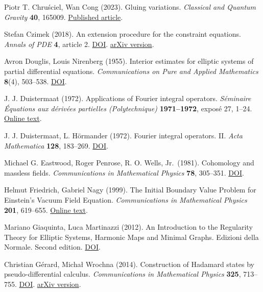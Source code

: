 \documentclass[
  english,
  11pt,
  reqno]{amsart}
\begin{document}
\leavevmode{}\label{ref-ChruscielCong2023}Piotr T. Chruściel, Wan Cong (2023). Gluing variations. \emph{Classical
and Quantum Gravity} \textbf{40}, 165009.
\href{https://doi.org/10.1088/1361-6382/ace494}{Published article}.

\leavevmode{}\label{ref-Czimek2018}Stefan Czimek (2018). An extension procedure for the constraint
equations. \emph{Annals of PDE} \textbf{4}, article 2.
\href{https://doi.org/10.1007/s40818-017-0039-3}{DOI}.
\href{https://arxiv.org/abs/1609.08814v2}{arXiv version}.

\leavevmode{}\label{ref-DouglisNirenberg1955}Avron Douglis, Louis Nirenberg (1955). Interior estimates for elliptic
systems of partial differential equations. \emph{Communications on Pure
and Applied Mathematics} \textbf{8}(4), 503--538.
\href{https://doi.org/10.1002/cpa.3160080406}{DOI}.

\leavevmode{}\label{ref-Duistermaat1972FIO}J. J. Duistermaat (1972). Applications of Fourier integral operators.
\emph{Séminaire Équations aux dérivées partielles (Polytechnique)}
\textbf{1971--1972}, exposé 27, 1--24.
\href{https://www.numdam.org/article/SEDP_1971-1972____A27_0.pdf}{Online
text}.

\leavevmode{}\label{ref-DuistermaatHormander1972}J. J. Duistermaat, L. Hörmander (1972). Fourier integral operators. II.
\emph{Acta Mathematica} \textbf{128}, 183--269.
\href{https://doi.org/10.1007/BF02392165}{DOI}.

\leavevmode{}\label{ref-EastwoodPenroseWells1981}Michael G. Eastwood, Roger Penrose, R. O. Wells, Jr.~(1981). Cohomology
and massless fields. \emph{Communications in Mathematical Physics}
\textbf{78}, 305--351. \href{https://doi.org/10.1007/BF01942327}{DOI}.

\leavevmode{}\label{ref-FriedrichNagy1999}Helmut Friedrich, Gabriel Nagy (1999). The Initial Boundary Value
Problem for Einstein's Vacuum Field Equation. \emph{Communications in
Mathematical Physics} \textbf{201}, 619--655.
\href{https://users.math.msu.edu/users/gnagy/papers/hFgN99.pdf}{Online
text}.

\leavevmode{}\label{ref-GiaquintaMartinazzi2012}Mariano Giaquinta, Luca Martinazzi (2012). An Introduction to the
Regularity Theory for Elliptic Systems, Harmonic Maps and Minimal
Graphs. Edizioni della Normale. Second edition.
\href{https://doi.org/10.1007/978-88-7642-443-4}{DOI}.

\leavevmode{}\label{ref-gerard-wrochna2014}Christian Gérard, Michał Wrochna (2014). Construction of Hadamard states
by pseudo-differential calculus. \emph{Communications in Mathematical
Physics} \textbf{325}, 713--755.
\href{https://doi.org/10.1007/s00220-013-1824-9}{DOI}.
\href{https://arxiv.org/abs/1209.2604v4}{arXiv version}.
\end{document}
